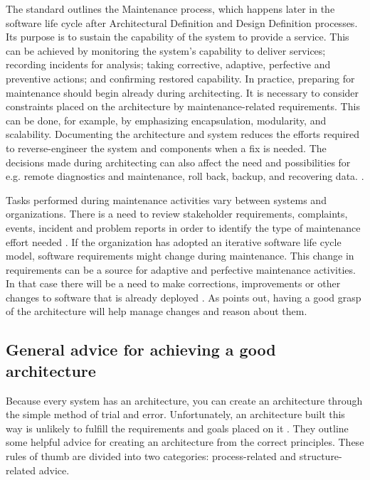 \documentclass[utf8,english]{gradu3}
\begin{document}
The standard \textcite{IEEE12207} outlines the Maintenance process, which
happens later in the software life cycle after Architectural Definition and Design
Definition processes. Its purpose is to sustain the capability of the system to
provide a service. This can be achieved by monitoring the system's capability to
deliver services; recording incidents for analysis; taking corrective, adaptive,
perfective and preventive actions; and confirming restored capability. In
practice, preparing for maintenance should begin already during architecting. It
is necessary to consider constraints placed on the architecture by
maintenance-related requirements. This can be done, for example, by emphasizing
encapsulation, modularity, and scalability. Documenting the architecture and
system reduces the efforts required to reverse-engineer the system and
components when a fix is needed. The decisions made during architecting can also
affect the need and possibilities for e.g. remote diagnostics and maintenance,
roll back, backup, and recovering data. \parencite[95-96]{IEEE12207}.

Tasks performed during maintenance activities vary between systems and
organizations. There is a need to review stakeholder requirements, complaints,
events, incident and problem reports in order to identify the type of
maintenance effort needed \parencite{IEEE12207}. If the organization has adopted
an iterative software life cycle model, software requirements might change
during maintenance. This change in requirements can be a source for adaptive and
perfective maintenance activities. In that case there will be a need to make
corrections, improvements or other changes to software that is already deployed
\parencite[97]{IEEE12207}. As \textcite[32]{Bass1998} points out, having a good
grasp of the architecture will help manage changes and reason about them.


\subsection{General advice for achieving a good architecture}

Because every system has an architecture, you can create an architecture through
the simple method of trial and error. Unfortunately, an architecture built this
way is unlikely to fulfill the requirements and goals placed on it
\parencite[24]{Bass1998}. They outline some helpful advice for creating an
architecture from the correct principles. These rules of thumb are divided into
two categories: process-related and structure-related advice.
\end{document}
